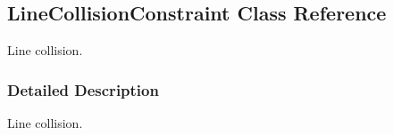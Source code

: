 \hypertarget{classOpenRAVE_1_1planningutils_1_1LineCollisionConstraint}{
\subsection{LineCollisionConstraint Class Reference}
\label{classOpenRAVE_1_1planningutils_1_1LineCollisionConstraint}
}


Line collision.  




\subsubsection{Detailed Description}
Line collision. 
